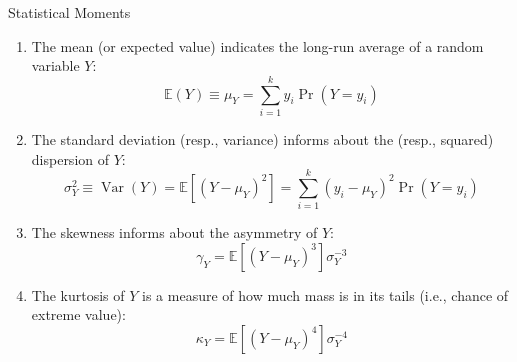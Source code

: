 \documentclass[notes,10pt, aspectratio=169]{beamer}
\begin{document}
\begin{frame}{Statistical Moments}
        \begin{enumerate}
            \item The mean (or expected value) indicates the long-run average of a random variable $Y$:
            \begin{equation*}
                \mathbb{E}(Y)\equiv\mu_Y = \sum^k_{i=1} y_i\Pr(Y=y_i)
            \end{equation*}
            \item The standard deviation (resp., variance) informs about the (resp., squared) dispersion of $Y$:
            \begin{equation*}
                \sigma^2_Y \equiv \operatorname{Var}(Y) = \mathbb{E}[(Y-\mu_Y)^2]= \sum^k_{i=1}(y_i-\mu_Y)^2\Pr(Y=y_i)
            \end{equation*}
            \item The skewness informs about the asymmetry of $Y$:
            \begin{equation*}
                \gamma_Y = \mathbb{E}[(Y-\mu_Y)^3]\sigma_Y^{-3}
            \end{equation*}
            \item The kurtosis of $Y$ is a measure of how much mass is in its tails (i.e., chance of extreme value):
            \begin{equation*}
                \kappa_Y = \mathbb{E}[(Y-\mu_Y)^4]\sigma_Y^{-4}
            \end{equation*}
            \end{enumerate}
\end{frame}
\end{document}
